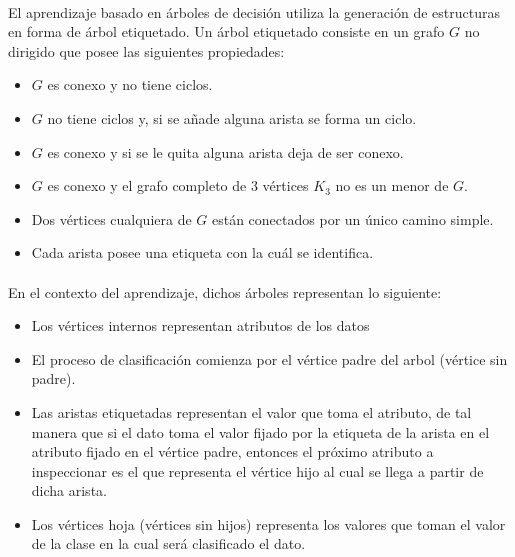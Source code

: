\documentclass[10pt, a4paper,spanish]{article}
\begin{document}
		\paragraph{}
		El aprendizaje basado en árboles de decisión utiliza la generación de estructuras en forma de árbol etiquetado. Un árbol etiquetado consiste en un grafo $G$ no dirigido que posee las siguientes propiedades\cite{wiki:tree}:

 		\begin{itemize}
			\setlength\itemsep{0em}
 			\item $G$ es conexo y no tiene ciclos.
			\item $G$ no tiene ciclos y, si se añade alguna arista se forma un ciclo.
			\item $G$ es conexo y si se le quita alguna arista deja de ser conexo.
			\item $G$ es conexo y el grafo completo de 3 vértices $K_{3}$ no es un menor de $G$.
			\item Dos vértices cualquiera de $G$ están conectados por un único camino simple.
			\item Cada arista posee una etiqueta con la cuál se identifica.
 		\end{itemize}

		\paragraph{}
		En el contexto del aprendizaje, dichos árboles representan lo siguiente:

		\begin{itemize}
			\setlength\itemsep{0em}
			\item Los vértices internos representan atributos de los datos
			\item El proceso de clasificación comienza por el vértice padre del arbol (vértice sin padre).
			\item Las aristas etiquetadas representan el valor que toma el atributo, de tal manera que si el dato toma el valor fijado por la etiqueta de la arista en el atributo fijado en el vértice padre, entonces el próximo atributo a inspeccionar es el que representa el vértice hijo al cual se llega a partir de dicha arista.
			\item Los vértices hoja (vértices sin hijos) representa los valores que toman el valor de la clase en la cual será clasificado el dato.
 		\end{itemize}
\end{document}
